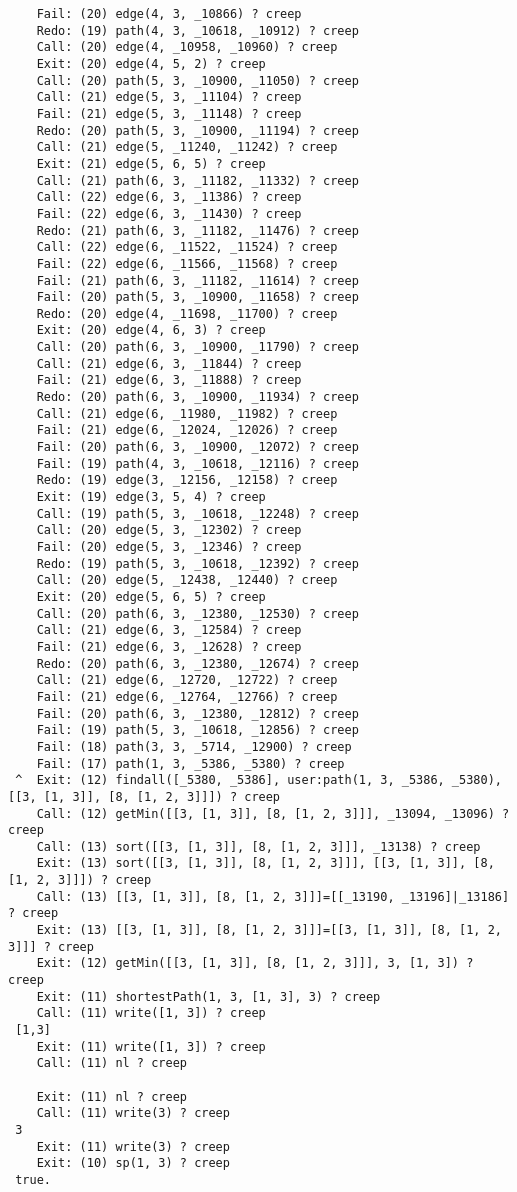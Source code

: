 \documentclass{article}
\begin{document}
\begin{lstlisting}
	Fail: (20) edge(4, 3, _10866) ? creep
	Redo: (19) path(4, 3, _10618, _10912) ? creep
	Call: (20) edge(4, _10958, _10960) ? creep
	Exit: (20) edge(4, 5, 2) ? creep
	Call: (20) path(5, 3, _10900, _11050) ? creep
	Call: (21) edge(5, 3, _11104) ? creep
	Fail: (21) edge(5, 3, _11148) ? creep
	Redo: (20) path(5, 3, _10900, _11194) ? creep
	Call: (21) edge(5, _11240, _11242) ? creep
	Exit: (21) edge(5, 6, 5) ? creep
	Call: (21) path(6, 3, _11182, _11332) ? creep
	Call: (22) edge(6, 3, _11386) ? creep
	Fail: (22) edge(6, 3, _11430) ? creep
	Redo: (21) path(6, 3, _11182, _11476) ? creep
	Call: (22) edge(6, _11522, _11524) ? creep
	Fail: (22) edge(6, _11566, _11568) ? creep
	Fail: (21) path(6, 3, _11182, _11614) ? creep
	Fail: (20) path(5, 3, _10900, _11658) ? creep
	Redo: (20) edge(4, _11698, _11700) ? creep
	Exit: (20) edge(4, 6, 3) ? creep
	Call: (20) path(6, 3, _10900, _11790) ? creep
	Call: (21) edge(6, 3, _11844) ? creep
	Fail: (21) edge(6, 3, _11888) ? creep
	Redo: (20) path(6, 3, _10900, _11934) ? creep
	Call: (21) edge(6, _11980, _11982) ? creep
	Fail: (21) edge(6, _12024, _12026) ? creep
	Fail: (20) path(6, 3, _10900, _12072) ? creep
	Fail: (19) path(4, 3, _10618, _12116) ? creep
	Redo: (19) edge(3, _12156, _12158) ? creep
	Exit: (19) edge(3, 5, 4) ? creep
	Call: (19) path(5, 3, _10618, _12248) ? creep
	Call: (20) edge(5, 3, _12302) ? creep
	Fail: (20) edge(5, 3, _12346) ? creep
	Redo: (19) path(5, 3, _10618, _12392) ? creep
	Call: (20) edge(5, _12438, _12440) ? creep
	Exit: (20) edge(5, 6, 5) ? creep
	Call: (20) path(6, 3, _12380, _12530) ? creep
	Call: (21) edge(6, 3, _12584) ? creep
	Fail: (21) edge(6, 3, _12628) ? creep
	Redo: (20) path(6, 3, _12380, _12674) ? creep
	Call: (21) edge(6, _12720, _12722) ? creep
	Fail: (21) edge(6, _12764, _12766) ? creep
	Fail: (20) path(6, 3, _12380, _12812) ? creep
	Fail: (19) path(5, 3, _10618, _12856) ? creep
	Fail: (18) path(3, 3, _5714, _12900) ? creep
	Fail: (17) path(1, 3, _5386, _5380) ? creep
 ^  Exit: (12) findall([_5380, _5386], user:path(1, 3, _5386, _5380), [[3, [1, 3]], [8, [1, 2, 3]]]) ? creep
	Call: (12) getMin([[3, [1, 3]], [8, [1, 2, 3]]], _13094, _13096) ? creep
	Call: (13) sort([[3, [1, 3]], [8, [1, 2, 3]]], _13138) ? creep
	Exit: (13) sort([[3, [1, 3]], [8, [1, 2, 3]]], [[3, [1, 3]], [8, [1, 2, 3]]]) ? creep
	Call: (13) [[3, [1, 3]], [8, [1, 2, 3]]]=[[_13190, _13196]|_13186] ? creep
	Exit: (13) [[3, [1, 3]], [8, [1, 2, 3]]]=[[3, [1, 3]], [8, [1, 2, 3]]] ? creep
	Exit: (12) getMin([[3, [1, 3]], [8, [1, 2, 3]]], 3, [1, 3]) ? creep
	Exit: (11) shortestPath(1, 3, [1, 3], 3) ? creep
	Call: (11) write([1, 3]) ? creep
 [1,3]
	Exit: (11) write([1, 3]) ? creep
	Call: (11) nl ? creep
 
	Exit: (11) nl ? creep
	Call: (11) write(3) ? creep
 3
	Exit: (11) write(3) ? creep
	Exit: (10) sp(1, 3) ? creep
 true.
\end{lstlisting}
\end{document}
